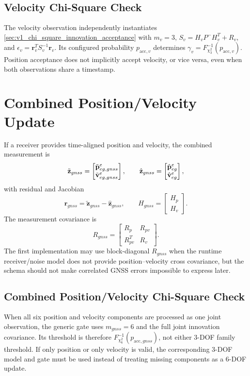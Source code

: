 \subsection{Velocity Chi-Square Check}

The velocity observation independently instantiates
\cref{sec:v1_chi_square_innovation_acceptance} with $m_v=3$,
$S_v=H_vP^-H_v^T+R_v$, and
$\epsilon_v=\mathbf{r}_v^TS_v^{-1}\mathbf{r}_v$. Its configured probability
$p_{\mathrm{acc},v}$ determines
$\gamma_v=F_{\chi^2_3}^{-1}(p_{\mathrm{acc},v})$. Position acceptance does not
implicitly accept velocity, or vice versa, even when both observations share a
timestamp.

\section{Combined Position/Velocity Update}

If a receiver provides time-aligned position and velocity, the combined
measurement is
\begin{equation}
\tilde{\mathbf{z}}_{gnss}
=
\begin{bmatrix}
\tilde{\mathbf{p}}_{eg,gnss}^{e}\\
\tilde{\mathbf{v}}_{eg,gnss}^{e}
\end{bmatrix},
\qquad
\hat{\mathbf{z}}_{gnss}
=
\begin{bmatrix}
\hat{\mathbf{p}}_{eg}^{e}\\
\hat{\mathbf{v}}_{eg}^{e}
\end{bmatrix},
\end{equation}
with residual and Jacobian
\begin{equation}
\mathbf{r}_{gnss}
=
\tilde{\mathbf{z}}_{gnss}
-
\hat{\mathbf{z}}_{gnss},
\qquad
H_{gnss}
=
\begin{bmatrix}
H_p\\
H_v
\end{bmatrix}.
\end{equation}
The measurement covariance is
\begin{equation}
R_{gnss}
=
\begin{bmatrix}
R_p & R_{pv}\\
R_{pv}^T & R_v
\end{bmatrix}.
\end{equation}
The first implementation may use block-diagonal $R_{gnss}$ when the runtime
receiver/noise model does not provide position--velocity cross covariance, but
the schema should not make correlated GNSS errors impossible to express later.

\subsection{Combined Position/Velocity Chi-Square Check}

When all six position and velocity components are processed as one joint
observation, the generic gate uses $m_{gnss}=6$ and the full joint innovation
covariance. Its threshold is therefore
$F_{\chi^2_6}^{-1}(p_{\mathrm{acc},gnss})$, not either 3-DOF family threshold.
If only position or only velocity is valid, the corresponding 3-DOF model and
gate must be used instead of treating missing components as a 6-DOF update.

